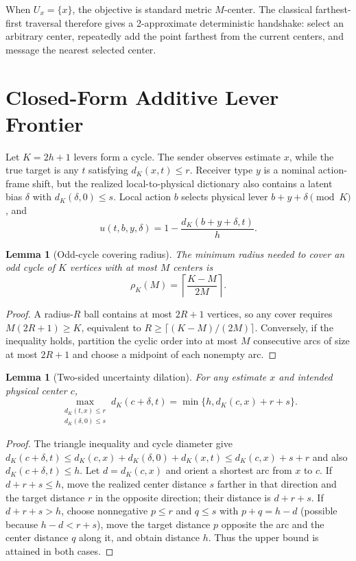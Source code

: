 \documentclass[letterpaper,10pt]{article}
\newtheorem{lemma}[theorem]{Lemma}
\begin{document}
When $U_x=\{x\}$, the objective is standard metric $M$-center. The classical
farthest-first traversal therefore gives a 2-approximate deterministic
handshake: select an arbitrary center, repeatedly add the point farthest from
the current centers, and message the nearest selected center.

\section{Closed-Form Additive Lever Frontier}

Let $K=2h+1$ levers form a cycle. The sender observes estimate $x$, while the
true target is any $t$ satisfying $d_K(x,t)\le r$. Receiver type $y$ is a
nominal action-frame shift, but the realized local-to-physical dictionary also
contains a latent bias $\delta$ with $d_K(\delta,0)\le s$. Local action $b$
selects physical lever $b+y+\delta\pmod K$, and
\[
u(t,b,y,\delta)=1-\frac{d_K(b+y+\delta,t)}{h}.
\]

\begin{lemma}[Odd-cycle covering radius]\label{lem:cover}
The minimum radius needed to cover an odd cycle of $K$ vertices with at most
$M$ centers is
\[
\rho_K(M)=\left\lceil\frac{K-M}{2M}\right\rceil.
\]
\end{lemma}
\begin{proof}
A radius-$R$ ball contains at most $2R+1$ vertices, so any cover requires
$M(2R+1)\ge K$, equivalent to
$R\ge\lceil(K-M)/(2M)\rceil$. Conversely, if the inequality holds, partition
the cyclic order into at most $M$ consecutive arcs of size at most $2R+1$ and
choose a midpoint of each nonempty arc.
\end{proof}

\begin{lemma}[Two-sided uncertainty dilation]\label{lem:dilation}
For any estimate $x$ and intended physical center $c$,
\[
\max_{\substack{d_K(t,x)\le r\\d_K(\delta,0)\le s}}
 d_K(c+\delta,t)
 =\min\{h,d_K(c,x)+r+s\}.
\]
\end{lemma}
\begin{proof}
The triangle inequality and cycle diameter give
$d_K(c+\delta,t)\le d_K(c,x)+d_K(\delta,0)+d_K(x,t)
\le d_K(c,x)+s+r$ and also $d_K(c+\delta,t)\le h$.
Let $d=d_K(c,x)$ and orient a shortest arc from $x$ to $c$. If
$d+r+s\le h$, move the realized center distance $s$ farther in that direction
and the target distance $r$ in the opposite direction; their distance is
$d+r+s$. If $d+r+s>h$, choose nonnegative $p\le r$ and $q\le s$ with
$p+q=h-d$ (possible because $h-d<r+s$), move the target distance $p$ opposite
the arc and the center distance $q$ along it, and obtain distance $h$.
Thus the upper bound is attained in both cases.
\end{proof}
\end{document}
